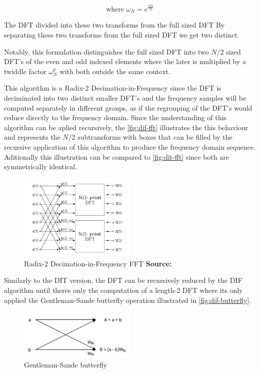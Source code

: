 \documentclass[
  oneside,
  11pt, a4paper,
  footinclude=true,
  headinclude=true,
  cleardoublepage=empty
]{scrbook}
\newcommand*{\source}[1]{%
    \textbf{Source:} \cite{#1}%
}
\begin{document}
\begin{equation*}
    \text{where } \omega_{N} = e^{\frac{i 2 \pi}{N}}
\end{equation*}

The DFT divided into these two transforms from the full sized DFT
By separating these two transforms from the full sized DFT we get two distinct 

Notably, this formulation distinguishes the full sized DFT into two \(N/2\) sized DFT's of the even and odd indexed elements where the later is multiplied by a twiddle factor \( \omega_{N}^{k} \) with both outside the same context. 

This algorithm is a Radix-2 Decimation-in-Frequency since the DFT is deciminated into two distinct smaller DFT's and the frequency samples will be computed separately in different groups, as if the regrouping of the DFT's would reduce directly to the frequency domain. Since the understanding of this algorithm can be aplied recursively, the \autoref{fig:dif-fft} illustrates the this behaviour and represents the \(N/2\) subtransforms with boxes that can be filled by the recursive application of this algorithm to produce the frequency domain sequence. Aditionally this illustration can be compared to \autoref{fig:dit-fft} since both are symmetrically identical.

\begin{figure}[h] 
    \centering
    \includegraphics[width=0.5\textwidth]{imgs/dif_fft.png}
    \caption{Radix-2 Decimation-in-Frequency FFT \source{jones2014digital}}
    \label{fig:dif-fft}
\end{figure}

Similarly to the DIT version, the DFT can be recursively reduced by the DIF algorithm until theres only the computation of a length-2 DFT where its only applied the Gentleman-Sande butterfly operation \cite{chu1999inside} illustrated in \autoref{fig:dif-butterfly}.

\begin{figure}[h]
    \centering
    \includegraphics[width=0.5\textwidth]{imgs/dif_butterfly.png}
    \caption{Gentleman-Sande butterfly}
    \label{fig:dif-butterfly}
\end{figure}
\end{document}
